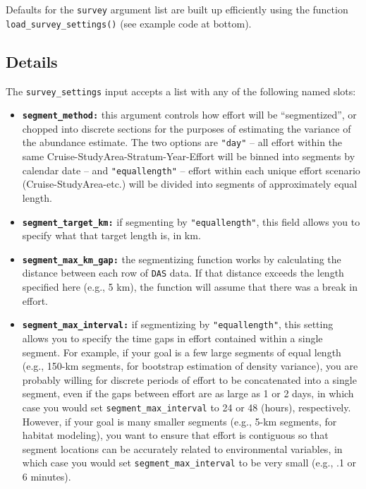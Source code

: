 \documentclass[
]{book}
\begin{document}
Defaults for the \texttt{survey} argument list are built up efficiently using the function \texttt{load\_survey\_settings()} (see example code at bottom).

\hypertarget{details}{%
\subsection*{Details}\label{details}}

The \texttt{survey\_settings} input accepts a list with any of the following named slots:

\begin{itemize}
\item
  \textbf{\texttt{segment\_method:}} this argument controls how effort will be ``segmentized'', or chopped into discrete sections for the purposes of estimating the variance of the abundance estimate. The two options are \texttt{"day"} -- all effort within the same Cruise-StudyArea-Stratum-Year-Effort will be binned into segments by calendar date -- and \texttt{"equallength"} -- effort within each unique effort scenario (Cruise-StudyArea-etc.) will be divided into segments of approximately equal length.
\item
  \textbf{\texttt{segment\_target\_km:}} if segmenting by \texttt{"equallength"}, this field allows you to specify what that target length is, in km.
\item
  \textbf{\texttt{segment\_max\_km\_gap:}} the segmentizing function works by calculating the distance between each row of \texttt{DAS} data. If that distance exceeds the length specified here (e.g., 5 km), the function will assume that there was a break in effort.
\item
  \textbf{\texttt{segment\_max\_interval:}} if segmentizing by \texttt{"equallength"}, this setting allows you to specify the time gaps in effort contained within a single segment. For example, if your goal is a few large segments of equal length (e.g., 150-km segments, for bootstrap estimation of density variance), you are probably willing for discrete periods of effort to be concatenated into a single segment, even if the gaps between effort are as large as 1 or 2 days, in which case you would set \texttt{segment\_max\_interval} to 24 or 48 (hours), respectively. However, if your goal is many smaller segments (e.g., 5-km segments, for habitat modeling), you want to ensure that effort is contiguous so that segment locations can be accurately related to environmental variables, in which case you would set \texttt{segment\_max\_interval} to be very small (e.g., .1 or 6 minutes).

\end{itemize}
\end{document}
